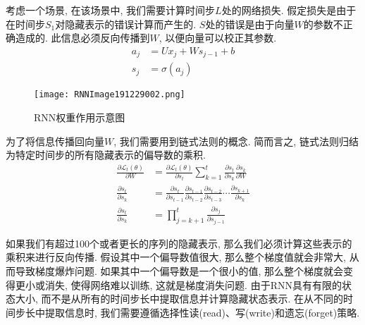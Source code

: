 考虑一个场景, 在该场景中, 我们需要计算时间步$L$处的网络损失. 假定损失是由于在时间步$S_1$对隐藏表示的错误计算而产生的. $S$处的错误是由于向量$W$的参数不正确造成的. 此信息必须反向传播到$W$, 以便向量可以校正其参数.
\begin{align}
a_{j}&=U x_{j}+W s_{j-1}+b\\
s_{j}&=\sigma\left(a_{j}\right)
\end{align}
\begin{figure}[H]
\centering
\texttt{[image: RNNImage191229002.png]}
\caption{RNN权重作用示意图}
\label{RNNImage191229002}
\end{figure}

为了将信息传播回向量$W$, 我们需要用到链式法则的概念. 简而言之, 链式法则归结为特定时间步的所有隐藏表示的偏导数的乘积.
\begin{align}
\frac{\partial \mathscr{L}_{t}(\theta)}{\partial W}&=\frac{\partial \mathscr{L}_{t}(\theta)}{\partial s_{t}} \sum_{k=1}^{t} \frac{\partial s_{t}}{\partial s_{k}} \frac{\partial s_{k}}{\partial W}\\
\frac{\partial s_{t}}{\partial s_{k}}&=\frac{\partial s_{t}}{\partial s_{t-1}} \frac{\partial s_{t-1}}{\partial s_{t-2}} \frac{\partial s_{t-2}}{\partial s_{t-3}} \cdots \frac{\partial s_{k+1}}{\partial s_{k}}\\
\frac{\partial s_{t}}{\partial s_{k}}&=\prod_{j=k+1}^{t} \frac{\partial s_{j}}{\partial s_{j-1}}
\end{align}

如果我们有超过100个或者更长的序列的隐藏表示, 那么我们必须计算这些表示的乘积来进行反向传播. 假设其中一个偏导数值很大, 那么整个梯度值就会非常大, 从而导致梯度爆炸问题.
如果其中一个偏导数是一个很小的值, 那么整个梯度就会变得更小或消失, 使得网络难以训练, 这就是梯度消失问题.
由于RNN具有有限的状态大小, 而不是从所有的时间步长中提取信息并计算隐藏状态表示. 在从不同的时间步长中提取信息时, 我们需要遵循选择性读(read)、写(write)和遗忘(forget)策略.

